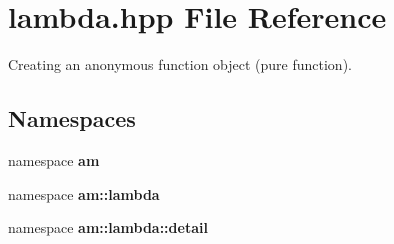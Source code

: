 \section{lambda.hpp File Reference}
\label{lambda_8hpp}
Creating an anonymous function object (pure function). 

\subsection*{Namespaces}
\begin{CompactItemize}
\item 
namespace {\bf am}
\item 
namespace {\bf am::lambda}
\item 
namespace \textbf{am::lambda::detail}
\end{CompactItemize}
